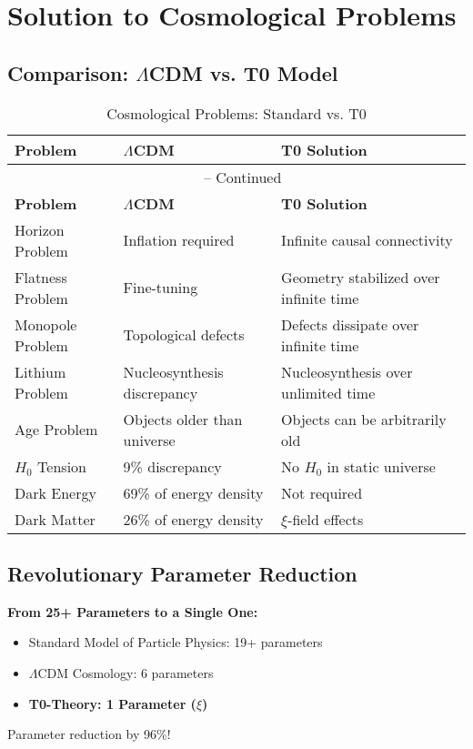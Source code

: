 \documentclass[12pt,a4paper]{article}
\newcommand{\xipar}{\xi}
\begin{document}
	\section{Solution to Cosmological Problems}
	
	\subsection{Comparison: $\Lambda$CDM vs. T0 Model}
	
	\begin{longtable}{p{4cm}p{4.5cm}p{4.5cm}}
		\caption{Cosmological Problems: Standard vs. T0} \\
		\toprule
		\textbf{Problem} & \textbf{$\Lambda$CDM} & \textbf{T0 Solution} \\
		\midrule
		\endfirsthead
		\multicolumn{3}{c}{\tablename\ \thetable{} -- Continued} \\
		\toprule
		\textbf{Problem} & \textbf{$\Lambda$CDM} & \textbf{T0 Solution} \\
		\midrule
		\endhead
		Horizon Problem & Inflation required & Infinite causal connectivity \\
		Flatness Problem & Fine-tuning & Geometry stabilized over infinite time \\
		Monopole Problem & Topological defects & Defects dissipate over infinite time \\
		Lithium Problem & Nucleosynthesis discrepancy & Nucleosynthesis over unlimited time \\
		Age Problem & Objects older than universe & Objects can be arbitrarily old \\
		$H_0$ Tension & 9\% discrepancy & No $H_0$ in static universe \\
		Dark Energy & 69\% of energy density & Not required \\
		Dark Matter & 26\% of energy density & $\xi$-field effects \\
		\bottomrule
	\end{longtable}
	
	\subsection{Revolutionary Parameter Reduction}
	
	\begin{revolutionary}
		\textbf{From 25+ Parameters to a Single One:}
		
		\begin{itemize}
			\item Standard Model of Particle Physics: 19+ parameters
			\item $\Lambda$CDM Cosmology: 6 parameters
			\item \textbf{T0-Theory: 1 Parameter ($\xipar$)}
		\end{itemize}
		
		Parameter reduction by 96\%!
	\end{revolutionary}
	
\end{document}
